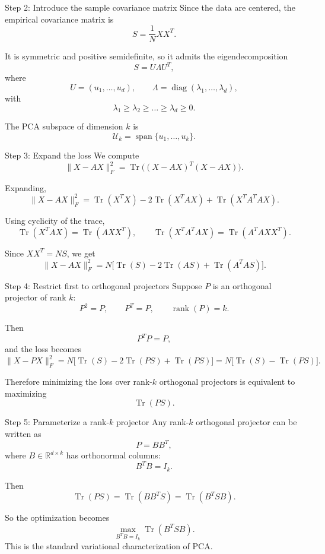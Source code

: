 \documentclass[aspectratio=169]{beamer}
\begin{document}
\begin{frame}{Step 2: Introduce the sample covariance matrix}
Since the data are centered, the empirical covariance matrix is
\[
S = \frac1N XX^T.
\]

It is symmetric and positive semidefinite, so it admits the eigendecomposition
\[
S = U \Lambda U^T,
\]
where
\[
U = (u_1,\dots,u_d),\qquad
\Lambda=\operatorname{diag}(\lambda_1,\dots,\lambda_d),
\]
with
\[
\lambda_1\ge \lambda_2\ge \dots \ge \lambda_d \ge 0.
\]

The PCA subspace of dimension \(k\) is
\[
\mathcal U_k = \operatorname{span}\{u_1,\dots,u_k\}.
\]
\end{frame}

\begin{frame}{Step 3: Expand the loss}
We compute
\[
\|X-AX\|_F^2
=
\operatorname{Tr}\Big((X-AX)^T(X-AX)\Big).
\]

Expanding,
\[
\|X-AX\|_F^2
=
\operatorname{Tr}(X^TX)
-2\operatorname{Tr}(X^TAX)
+\operatorname{Tr}(X^TA^TAX).
\]

Using cyclicity of the trace,
\[
\operatorname{Tr}(X^TAX)=\operatorname{Tr}(AXX^T),
\qquad
\operatorname{Tr}(X^TA^TAX)=\operatorname{Tr}(A^TAXX^T).
\]

Since \(XX^T = N S\), we get
\[
\|X-AX\|_F^2
=
N\Big[
\operatorname{Tr}(S)
-2\operatorname{Tr}(AS)
+\operatorname{Tr}(A^TAS)
\Big].
\]
\end{frame}

\begin{frame}{Step 4: Restrict first to orthogonal projectors}
Suppose \(P\) is an orthogonal projector of rank \(k\):
\[
P^2=P,\qquad P^T=P,\qquad \operatorname{rank}(P)=k.
\]

Then
\[
P^TP = P,
\]
and the loss becomes
\[
\|X-PX\|_F^2
=
N\Big[\operatorname{Tr}(S)-2\operatorname{Tr}(PS)+\operatorname{Tr}(PS)\Big]
=
N\Big[\operatorname{Tr}(S)-\operatorname{Tr}(PS)\Big].
\]

Therefore minimizing the loss over rank-\(k\) orthogonal projectors is equivalent to maximizing
\[
\operatorname{Tr}(PS).
\]
\end{frame}

\begin{frame}{Step 5: Parameterize a rank-\(k\) projector}
Any rank-\(k\) orthogonal projector can be written as
\[
P = BB^T,
\]
where \(B\in \mathbb{R}^{d\times k}\) has orthonormal columns:
\[
B^TB=I_k.
\]

Then
\[
\operatorname{Tr}(PS)
=
\operatorname{Tr}(BB^TS)
=
\operatorname{Tr}(B^TSB).
\]

So the optimization becomes
\[
\max_{B^TB=I_k}\operatorname{Tr}(B^TSB).
\]
This is the standard variational characterization of PCA.
\end{frame}
\end{document}

